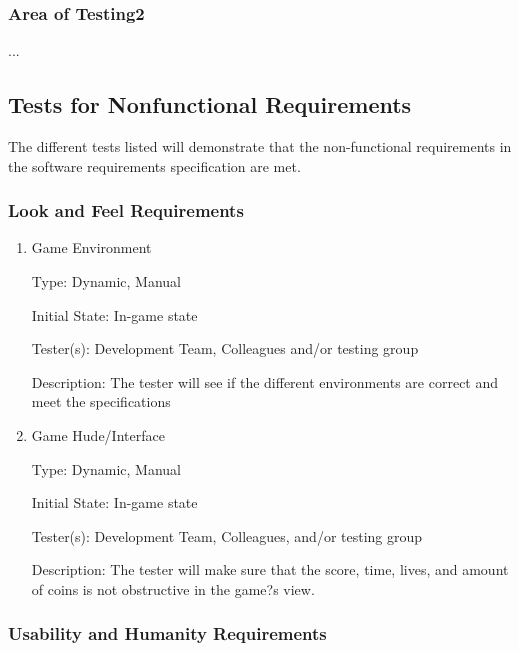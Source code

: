 \documentclass[12pt, titlepage]{article}
\begin{document}
\subsubsection{Area of Testing2}

...

\subsection{Tests for Nonfunctional Requirements}
The different tests listed will demonstrate that the non-functional requirements in the software requirements specification are met.

\subsubsection{Look and Feel Requirements}

\begin{enumerate}

\item{Game Environment\\}

Type: Dynamic, Manual

Initial State: In-game state

Tester(s): Development Team, Colleagues and/or testing group

Description: The tester will see if the different environments are correct and meet the specifications
					
\item{Game Hude/Interface\\}

Type: Dynamic, Manual

Initial State: In-game state

Tester(s): Development Team, Colleagues, and/or testing group

Description: The tester will make sure that the score, time, lives, and amount of coins is not obstructive in the game?s view.

\end{enumerate}

\subsubsection{Usability and Humanity Requirements}
\end{document}
